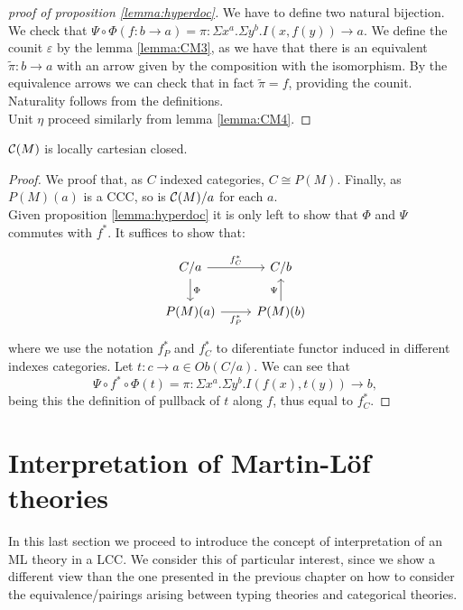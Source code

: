 \begin{proof}[proof of proposition \ref{lemma:hyperdoc}]
  We have to define two natural bijection. We check that $\Psi\circ\Phi(f:b\to a) = \pi: \Sigma x^a. \Sigma y^b.I(x,f(y)) \to a$. We define the counit $\varepsilon$ by the lemma \ref{lemma:CM3}, as we have that there is an equivalent $\tilde \pi : b \to a$ with an arrow given by the composition with the isomorphism. By the equivalence arrows we can check that in fact $\tilde \pi = f$, providing the counit. Naturality follows from the definitions.\\

  Unit $\eta$ proceed similarly from lemma \ref{lemma:CM4}.

\end{proof}
\begin{theorem}
  $\mathcal{C}(M)$ is locally cartesian closed.
\end{theorem}
\begin{proof}
  We proof that, as $C$ indexed categories, $C\cong P(M)$. Finally, as $P(M)(a)$ is a CCC, so is $\mathcal{C}(M)/a$ for each $a$.\\

  Given proposition \ref{lemma:hyperdoc} it is only left to show that $\Phi$ and $\Psi$ commutes with $f^*$. It suffices to show that:
    \[
    \begin{tikzpicture}
      \node {\begin{tikzcd}
          C/a \ar[d,"\Phi"]\ar[r,"f_C^*"] & C/b\\
          P(M)(a)\ar[r,swap,"f_P^*"] &   P(M)(b)\ar[u,"\Psi"]
        \end{tikzcd}};
    \end{tikzpicture}
  \]
  where we use the notation $f_P^*$ and $f_C^*$ to diferentiate functor induced in different indexes categories.   Let $t:c\to a \in Ob(C/a)$. We can see that
  $$\Psi\circ f^*\circ \Phi(t) = \pi: \Sigma x^a. \Sigma y^b.I(f(x),t(y)) \to b,$$
  being this the definition of pullback of $t$ along $f$, thus equal to $f_C^*$.
\end{proof}


\section{Interpretation of Martin-L\"of theories}
\label{InterpretationLCC}
In this last section we proceed to introduce the concept of interpretation of an ML theory in a LCC. We consider this of particular interest, since we show a different view than the one presented in the previous chapter on how to consider the equivalence/pairings arising between typing theories and categorical theories.\\

